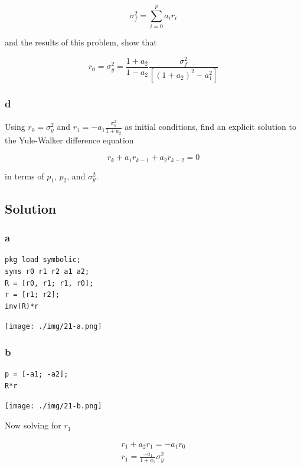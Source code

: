 \documentclass[11pt,a4paper,final]{article}
\begin{document}
$$
\sigma_f^2 = \sum_{i=0}^p a_i r_i
$$

and the results of this problem, show that

$$
r_0 = \sigma_y^2 = \frac{1+a_2}{1-a_2} \frac{\sigma_f^2}{[(1+a_2)^2 - a_1^2]}
$$

\subsubsection{d}
\label{sec:org1f6785f}
Using \(r_0 = \sigma_y^2\) and \(r_1 = -a_1 \frac{\sigma_y^2}{1+a_2}\) as initial conditions, find an explicit solution to the
Yule-Walker difference equation

$$
r_k + a_1 r_{k-1} + a_2 r_{k-2} = 0
$$

in terms of \(p_1\), \(p_2\), and \(\sigma_y^2\).

\subsection{Solution}
\label{sec:orgbab06bb}
\subsubsection{a}
\label{sec:org3fda2ef}

\begin{verbatim}
pkg load symbolic;
syms r0 r1 r2 a1 a2;
R = [r0, r1; r1, r0];
r = [r1; r2];
inv(R)*r
\end{verbatim}

\begin{center}
\texttt{[image: ./img/21-a.png]}
\end{center}

\subsubsection{b}
\label{sec:orgf50f2a4}

\begin{verbatim}
p = [-a1; -a2];
R*r
\end{verbatim}

\begin{center}
\texttt{[image: ./img/21-b.png]}
\end{center}

Now solving for \(r_1\)

\begin{equation*}
\begin{array}{l}
r_1 + a_2 r_1 = -a_1 r_0 \\
r_1 = \frac{-a_1}{1+a_1}\sigma_y^2
\end{array}
\end{equation*}
\end{document}
